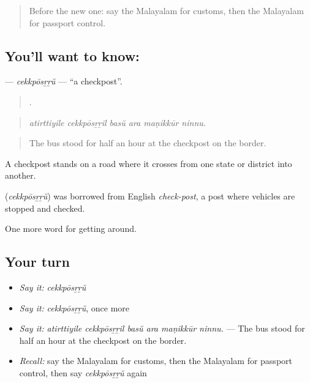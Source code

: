 \label{lesson:ML-C464-cekkposrru}



\begin{quote}
Before the new one: say the Malayalam for customs, then the Malayalam for passport control.
\end{quote}

\subsection*{You'll want to know: }
\textbf{} — \emph{cekkpōsṟṟŭ} — \textquotedblleft{}a checkpost\textquotedblright{}.

\begin{quote}
     .
\end{quote}

\begin{quote}
\emph{atirttiyile cekkpōsṟṟil basŭ ara maṇikkūr ninnu.}
\end{quote}

\begin{quote}
The bus stood for half an hour at the checkpost on the border.
\end{quote}

A checkpost stands on a road where it crosses from one state or district into another.

\begin{cousinweb}
\textbf{} (\emph{cekkpōsṟṟŭ}) was borrowed from English \emph{check-post}, a post where vehicles are stopped and checked.
\end{cousinweb}

\begin{grammarlens}[title={What you've built}]
One more word for getting around.
\end{grammarlens}

\subsection*{Your turn}
\begin{itemize}
\raggedright
  \item \emph{Say it:} \emph{cekkpōsṟṟŭ}
  \item \emph{Say it:} \emph{cekkpōsṟṟŭ}, once more
  \item \emph{Say it:} \emph{atirttiyile cekkpōsṟṟil basŭ ara maṇikkūr ninnu.} — The bus stood for half an hour at the checkpost on the border.
  \item \emph{Recall:} say the Malayalam for customs, then the Malayalam for passport control, then say \emph{cekkpōsṟṟŭ} again
\end{itemize}

